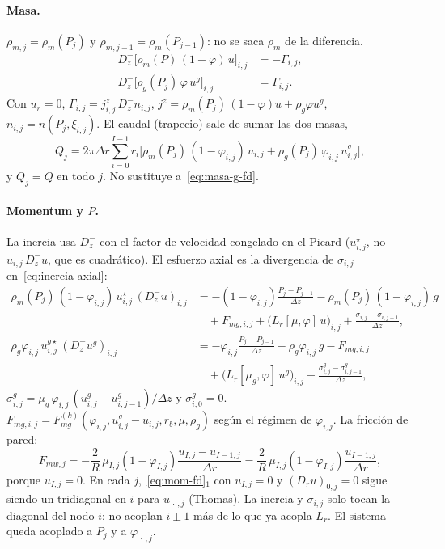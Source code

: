 \documentclass[11pt,a4paper]{article}
\begin{document}
\paragraph{Masa.}
$\rho_{m,j}=\rho_m(P_j)$ y $\rho_{m,j-1}=\rho_m(P_{j-1})$:
no se saca $\rho_m$ de la diferencia.
\begin{align}
\label{eq:masa-fd}
D_z^-\bigl[\rho_m(P)\,(1-\varphi)\,u\bigr]_{i,j}
&=-\Gamma_{i,j},
\\
\label{eq:masa-g-fd}
D_z^-\bigl[\rho_g(P_j)\,\varphi\,u^g\bigr]_{i,j}
&=\Gamma_{i,j}.
\end{align}
Con $u_r=0$,
$\Gamma_{i,j}
=j^z_{i,j}\,D_z^- n_{i,j}$,
$j^z=\rho_m(P_j)\,(1-\varphi)u+\rho_g\varphi u^g$,
$n_{i,j}=n(P_j,\xi_{i,j})$.
El caudal (trapecio) sale de sumar las dos masas,
\begin{equation}
\label{eq:Q-fd}
Q_j
=2\pi\Delta r\sum_{i=0}^{I-1} r_i
\bigl[\rho_m(P_j)\,(1-\varphi_{i,j})\,u_{i,j}
+\rho_g(P_j)\,\varphi_{i,j}\,u^g_{i,j}\bigr],
\end{equation}
y $Q_j=Q$ en todo $j$. No sustituye a~\eqref{eq:masa-g-fd}.

\paragraph{Momentum y $P$.}
La inercia usa $D_z^-$ con el factor de velocidad congelado
en el Picard ($u^\star_{i,j}$, no $u_{i,j}\,D_z^-u$, que es
cuadrático). El esfuerzo axial es la divergencia de
$\sigma_{i,j}$ en~\eqref{eq:inercia-axial}:
\begin{align}
\label{eq:mom-fd}
\rho_m(P_j)\,(1-\varphi_{i,j})\,u^\star_{i,j}\,(D_z^- u)_{i,j}
&=
-(1-\varphi_{i,j})\frac{P_j-P_{j-1}}{\Delta z}
-\rho_m(P_j)\,(1-\varphi_{i,j})\,g
\nonumber\\
&\quad
+F_{mg,i,j}
+\bigl(L_r[\mu,\varphi]\,u\bigr)_{i,j}
+\frac{\sigma_{i,j}-\sigma_{i,j-1}}{\Delta z},
\\[0.25em]
\rho_g\varphi_{i,j}\,u^{g\star}_{i,j}\,(D_z^- u^g)_{i,j}
&=
-\varphi_{i,j}\frac{P_j-P_{j-1}}{\Delta z}
-\rho_g\varphi_{i,j}\,g
-F_{mg,i,j}
\nonumber\\
&\quad
+\bigl(L_r[\mu_g,\varphi]\,u^g\bigr)_{i,j}
+\frac{\sigma^g_{i,j}-\sigma^g_{i,j-1}}{\Delta z},
\end{align}
$\sigma^g_{i,j}
=\mu_g\,\varphi_{i,j}\,(u^g_{i,j}-u^g_{i,j-1})/\Delta z$
y $\sigma^g_{i,0}=0$.
$F_{mg,i,j}=F_{mg}^{(k)}(\varphi_{i,j},u^g_{i,j}-u_{i,j},r_b,\mu,\rho_g)$
según el régimen de $\varphi_{i,j}$. La fricción de pared:
\begin{equation}
\label{eq:Fmw-fd}
F_{mw,j}
=-\frac{2}{R}\,
\mu_{I,j}(1-\varphi_{I,j})
\frac{u_{I,j}-u_{I-1,j}}{\Delta r}
=\frac{2}{R}\,
\mu_{I,j}(1-\varphi_{I,j})
\frac{u_{I-1,j}}{\Delta r},
\end{equation}
porque $u_{I,j}=0$. En cada $j$,~\eqref{eq:mom-fd}$_1$
con $u_{I,j}=0$ y $(D_r u)_{0,j}=0$ sigue siendo un
tridiagonal en $i$ para $u_{\,\cdot\,,j}$ (Thomas). La
inercia y $\sigma_{i,j}$ solo tocan la diagonal del nodo
$i$; no acoplan $i\pm 1$ más de lo que ya acopla $L_r$.
El sistema queda acoplado a $P_j$ y a
$\varphi_{\,\cdot\,,j}$.
\end{document}
